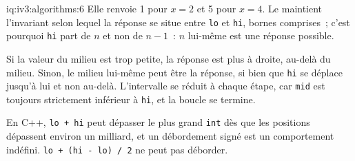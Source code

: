 \begin{solution}{iq:iv3:algorithms:6}
Elle renvoie 1 pour $x = 2$ et 5 pour $x = 4$. Le  maintient l'invariant selon lequel la réponse se situe entre \texttt{lo} et \texttt{hi}, bornes comprises~; c'est pourquoi \texttt{hi} part de $n$ et non de $n - 1$~: $n$ lui-même est une réponse possible.
\label{lst:iv3:al:lowerbound}

Si la valeur du milieu est trop petite, la réponse est plus à droite, au-delà du milieu. Sinon, le milieu lui-même peut être la réponse, si bien que \texttt{hi} se déplace jusqu'à lui et non au-delà. L'intervalle se réduit à chaque étape, car \texttt{mid} est toujours strictement inférieur à \texttt{hi}, et la boucle se termine.

En C++, \texttt{lo + hi} peut dépasser le plus grand \texttt{int} dès que les positions dépassent environ un milliard, et un débordement signé est un comportement indéfini. \texttt{lo + (hi - lo) / 2} ne peut pas déborder.

\end{solution}

